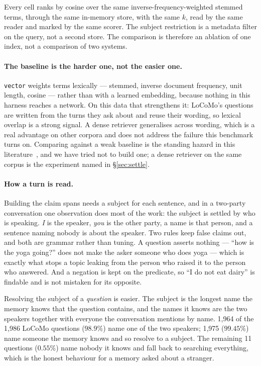 \documentclass[11pt]{article}
\newcommand{\arm}[1]{\texttt{#1}}
\begin{document}
Every cell ranks by cosine over the same inverse-frequency-weighted stemmed
terms, through the same in-memory store, with the same $k$, read by the same
reader and marked by the same scorer. The subject restriction is a metadata
filter on the query, not a second store. The comparison is therefore an
ablation of one index, not a comparison of two systems.



\paragraph{The baseline is the harder one, not the easier one.} \arm{vector}
weights terms lexically --- stemmed, inverse document frequency, unit length,
cosine --- rather than with a learned embedding, because nothing in this harness
reaches a network. On this data that strengthens it: LoCoMo's questions are
written from the turns they ask about and reuse their wording, so lexical
overlap is a strong signal. A dense retriever generalises across wording, which
is a real advantage on other corpora and does not address the failure this
benchmark turns on. Comparing against a weak baseline is the standing hazard in
this literature~\cite{neuralhype}, and we have tried not to build one; a dense
retriever on the same corpus is the experiment named in \S\ref{sec:settle}.

\paragraph{How a turn is read.} Building the claim spans needs a subject for
each sentence, and in a two-party conversation one observation does most of the
work: the subject is settled by who is speaking. \emph{I} is the speaker,
\emph{you} is the other party, a name is that person, and a sentence naming
nobody is about the speaker. Two rules keep false claims out, and both are
grammar rather than tuning. A question asserts nothing --- ``how is the yoga
going?'' does not make the asker someone who does yoga --- which is exactly what
stops a topic leaking from the person who raised it to the person who answered.
And a negation is kept on the predicate, so ``I do not eat dairy'' is findable
and is not mistaken for its opposite.

Resolving the subject of a \emph{question} is easier. The subject is the
longest name the memory knows that the question contains, and the names it
knows are the two speakers together with everyone the conversation mentions by
name. 1{,}964 of the 1{,}986 LoCoMo questions ($98.9\%$) name one of the two
speakers; 1{,}975 ($99.45\%$) name someone the memory knows and so resolve to a
subject. The remaining 11 questions ($0.55\%$) name nobody it knows and fall
back to searching everything, which is the honest behaviour for a memory asked
about a stranger.
\end{document}

